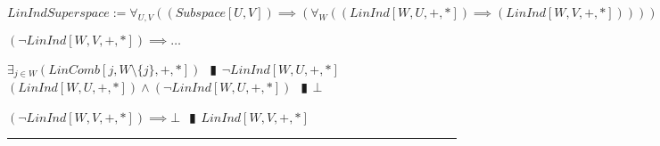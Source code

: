 \documentclass{book}
\newcommand{\abr}{:=}
\newcommand{\pipe}{$\phantom{(}\vrectangleblack\phantom{)}$}
\newcommand{\pr}[1]{\left(#1\right)}
\begin{document}
$LinIndSuperspace \abr \forall_{U, V}\pr{(Subspace[U, V]) \implies \pr{\forall_{W}\pr{(LinInd[W, U, +, *]) \implies (LinInd[W, V, +, *])}}}$
\begin{enumerate}
  \lit $(\lnot LinInd[W, V, +, *]) \implies \ldots$
  \begin{enumerate}
    \lit $\exists_{j \in W}(LinComb[j, W \setminus \{j\}, +, *])$ \pipe $\lnot LinInd[W, U, +, *]$
    \lit $(LinInd[W, U, +, *]) \land (\lnot LinInd[W, U, +, *])$ \pipe $\bot$
  \end{enumerate}
  \lit $(\lnot LinInd[W, V, +, *]) \implies \bot$ \pipe $LinInd[W, V, +, *]$
\end{enumerate} \vspace{.75mm} \hrule \vspace{.75mm} \ \\ 
\end{document}
